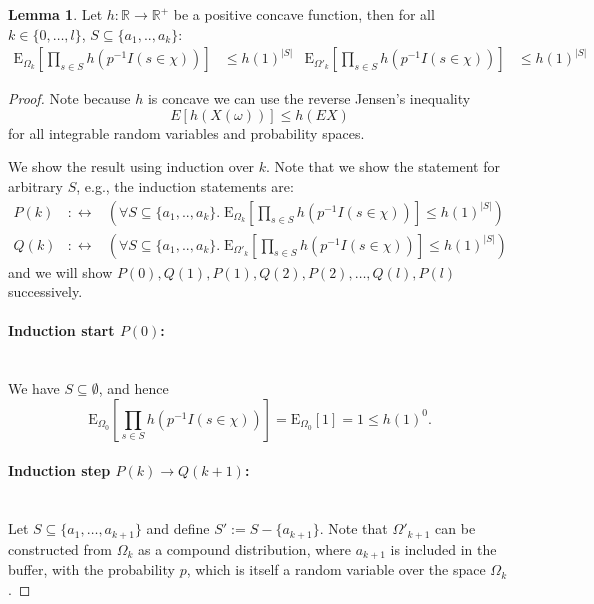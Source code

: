 \documentclass{article}
\newcommand{\expectation}{\mathrm{E}}
\theoremstyle{definition}
\newtheorem{lemma}{Lemma}
\begin{document}
\begin{lemma}
\label{le:neg_cor}
Let $h : \mathbb R \rightarrow \mathbb R^+$ be a positive concave function, then for all 
$k \in \{0,\ldots,l\}$, $S \subseteq \{a_1,..,a_k\}$:
\begin{align*}
  \expectation_{\Omega_k}\left[ \prod_{s \in S} h(p^{-1} I(s \in \chi)) \right] & \leq h(1)^{|S|} &
  \expectation_{\Omega'_k}\left[ \prod_{s \in S} h(p^{-1} I(s \in \chi)) \right] & \leq h(1)^{|S|}
\end{align*}
\end{lemma}
\begin{proof}
Note because $h$ is concave we can use the reverse Jensen's inequality
\begin{equation}\label{eq:rev_jensen}
  E [ h(X(\omega)) ] \leq h(E X)
\end{equation}
for all integrable random variables and probability spaces. 

We show the result using induction over $k$. Note that we show the statement for arbitrary $S$, e.g., the induction statements are:
\begin{eqnarray*}
P(k) & :\leftrightarrow & \left(\forall S \subseteq \{a_1,..,a_k\}. \; \expectation_{\Omega_k}\left[ \prod_{s \in S} h(p^{-1} I(s \in \chi)) \right] \leq h(1)^{|S|} \right) \\
Q(k) & :\leftrightarrow & \left(\forall S \subseteq \{a_1,..,a_k\}. \; \expectation_{\Omega'_k}\left[ \prod_{s \in S} h(p^{-1} I(s \in \chi)) \right] \leq h(1)^{|S|} \right)
\end{eqnarray*}
and we will show $P(0),Q(1),P(1),Q(2),P(2),\ldots,Q(l),P(l)$ successively.
\paragraph{Induction start $P(0)$:} \phantom{.}\\
We have $S \subseteq \emptyset$, and hence
\[
\expectation_{\Omega_0}\left[ \prod_{s \in S} h(p^{-1} I(s \in \chi)) \right] = \expectation_{\Omega_0}\left[1\right] = 1 \leq h(1)^0 \textrm{.}
\]
\paragraph{Induction step $P(k) \rightarrow Q(k+1)$:} \phantom{.}\\
Let $S \subseteq \{ a_1, \ldots, a_{k+1} \}$ and define $S' := S - \{ a_{k+1} \}$.
Note that $\Omega'_{k+1}$ can be constructed from $\Omega_k$ as a compound distribution, where $a_{k+1}$ is included in the buffer, with the probability $p$, which is itself a random variable over the space $\Omega_k$.


\end{proof}
\end{document}
